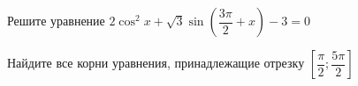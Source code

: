 \begin{ex}
	\begin{condition}
		\begin{enumcols}[label=\asbuk*)]
			\item Решите уравнение \( 2\cos^2 x + \sqrt{3}\sin{\left(\dfrac{3\pi}{2}+x\right)} - 3 = 0 \)
			\item Найдите все корни уравнения, принадлежащие отрезку \( \left[\dfrac{\pi}{2};\dfrac{5\pi}{2}\right] \)
		\end{enumcols}
	\end{condition}
\end{ex}